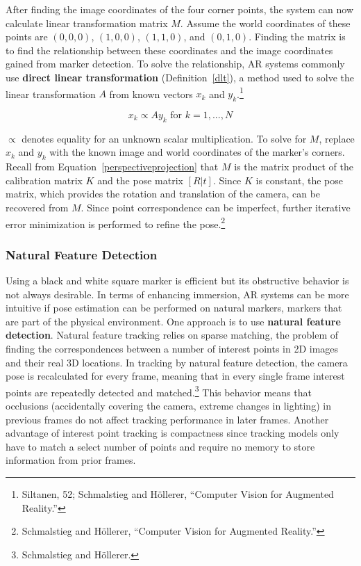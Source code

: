 After finding the image coordinates of the four corner points, the system can now calculate linear transformation matrix $M$. Assume the world coordinates of these points are $(0, 0, 0)$, $(1, 0, 0)$, $(1, 1, 0)$, and $(0, 1, 0)$. Finding the matrix is to find the relationship between these coordinates and the image coordinates gained from marker detection. To solve the relationship, AR systems commonly use \textbf{direct linear transformation} (Definition~\ref{dlt}), a method used to solve the linear transformation $A$ from known vectors $x_k$ and $y_k$.\footnote{Siltanen, 52; Schmalstieg and Höllerer, “Computer Vision for Augmented Reality.”}

\begin{defn}\label{dlt}
\begin{equation}
x_k \propto Ay_k \text{ for } k = 1,...,N
\end{equation} \end{defn}
$\propto$ denotes equality for an unknown scalar multiplication. To solve for $M$, replace $x_k$ and $y_k$ with the known image and world coordinates of the marker's corners. Recall from Equation~\ref{perspectiveprojection} that $M$ is the matrix product of the calibration matrix $K$ and the pose matrix $[R|t]$. Since $K$ is constant, the pose matrix, which provides the rotation and translation of the camera, can be recovered from $M$. Since point correspondence can be imperfect, further iterative error minimization is performed to refine the pose.\footnote{Schmalstieg and Höllerer, “Computer Vision for Augmented Reality.”}

\subsubsection{Natural Feature Detection}
Using a black and white square marker is efficient but its obstructive behavior is not always desirable. In terms of enhancing immersion, AR systems can be more intuitive if pose estimation can be performed on natural markers, markers that are part of the physical environment. One approach is to use \textbf{natural feature detection}. Natural feature tracking relies on sparse matching, the problem of finding the correspondences between a number of interest points in 2D images and their real 3D locations. In tracking by natural feature detection, the camera pose is recalculated for every frame, meaning that in every single frame interest points are repeatedly detected and matched.\footnote{Schmalstieg and Höllerer.} This behavior means that occlusions (accidentally covering the camera, extreme changes in lighting) in previous frames do not affect tracking performance in later frames. Another advantage of interest point tracking is compactness since tracking models only have to match a select number of points and require no memory to store information from prior frames.

